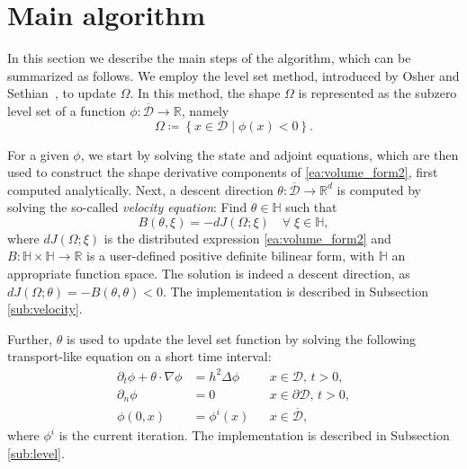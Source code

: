 \documentclass[preprint,9pt]{elsarticle}
\begin{document}
\section{Main algorithm}\label{sec:algo}

In this section we describe the main steps of the algorithm,
which can be summarized as follows. 
We employ the level set method, introduced by
Osher and Sethian~\cite{MR965860}, to update $\Omega$. 
In this method, the shape $\Omega$ is represented as
the subzero level set of a function
$\phi\colon\overline{\mathcal{D}}\to\mathds{R}$, namely
\begin{equation}\label{eq:subdomain}
	\Omega\coloneqq\left\{x\in\mathcal{D}\mid\phi(x)<0\right\}.
\end{equation}

For a given $\phi$, we start by solving the state and adjoint equations,
which are then used to construct the shape derivative components
of \eqref{ea:volume_form2}, first computed analytically.
Next, a descent direction $\theta\colon\overline{\mathcal{D}}\to\mathds{R}^d$
is computed by solving the so-called {\it velocity equation}:
Find $\theta\in\mathbb{H}$ such that
\begin{equation}\label{eq:velocity_eq0} 
	B(\theta,\xi)=-dJ(\Omega;\xi)
	\quad\forall\;\xi\in\mathbb{H},
\end{equation}	
where $dJ(\Omega;\xi)$ is the distributed expression \eqref{ea:volume_form2}
and $B:\mathbb{H}\times\mathbb{H}\to\mathds{R}$ is a user-defined
positive definite bilinear form,
with $\mathbb{H}$ an appropriate function space.
The solution is indeed a descent direction, as
$dJ(\Omega;\theta)=-B(\theta,\theta)<0$.
The implementation is described in Subsection \ref{sub:velocity}.

Further, $\theta$ is used to update the level set function
by solving the following transport-like equation on a short time interval:
\begin{equation} \label{eq:transport0}
	\begin{aligned}
	\partial_t \phi+\theta\cdot\nabla\phi
		&= h^2\Delta\phi && x\in \mathcal{D},\, t>0, \\
	\partial_{n}\phi
		&= 0 && x\in \partial\mathcal{D},\, t>0, \\
	\phi(0, x)
		&= \phi^{i}(x) && x\in \overline{\mathcal{D}},
	\end{aligned}
\end{equation}
where $\phi^{i}$ is the current iteration.
The implementation is described in Subsection \ref{sub:level}.
\end{document}
